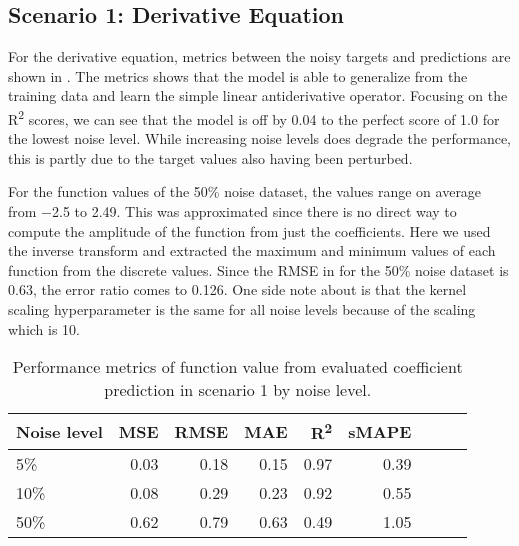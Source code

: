 \documentclass[preprint,12pt,times,authoryear]{elsarticle}
\begin{document}
\subsection{Scenario 1: Derivative Equation}
For the derivative equation, metrics between the noisy targets and predictions are shown in . The metrics shows that the model is able to generalize from the training data and learn the simple linear antiderivative operator. Focusing on the R\textsuperscript{2} scores, we can see that the model is off by 0.04 to the perfect score of 1.0 for the lowest noise level. While increasing noise levels does degrade the performance, this is partly due to the target values also having been perturbed.

For the function values of the 50\% noise dataset, the values range on average from \num{-2.5} to \num{2.49}. This was approximated since there is no direct way to compute the amplitude of the function from just the coefficients. Here we used the inverse transform and extracted the maximum and minimum values of each function from the discrete values. Since the RMSE in  for the 50\% noise dataset is \num{0.63}, the error ratio comes to \num{0.126}. One side note about  is that the kernel scaling hyperparameter is the same for all noise levels because of the scaling which is 10.
\begin{table}[H]
  \caption{Performance metrics of function value from evaluated coefficient prediction in scenario 1 by noise level.}\label{table:scenario_1_function_metrics}
  \centering
  \begin{tabular}{lrrrrrrrr}
    \toprule
    Noise level & MSE  & RMSE & MAE  & R\textsuperscript{2} & sMAPE \\
    \midrule
    5\%         & 0.03 & 0.18 & 0.15 & 0.97                 & 0.39  \\
    10\%        & 0.08 & 0.29 & 0.23 & 0.92                 & 0.55  \\
    50\%        & 0.62 & 0.79 & 0.63 & 0.49                 & 1.05  \\
    \bottomrule
  \end{tabular}
\end{table}
\end{document}
